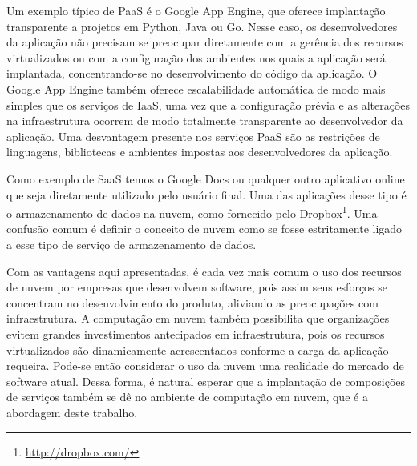 Um exemplo típico de PaaS é o Google App Engine, que oferece implantação transparente a projetos em Python, Java ou Go. Nesse caso, os desenvolvedores da aplicação não precisam se preocupar diretamente com a gerência dos recursos virtualizados ou com a configuração dos ambientes nos quais a aplicação será implantada, concentrando-se no desenvolvimento do código da aplicação. O Google App Engine também oferece escalabilidade automática de modo mais simples que os serviços de IaaS, uma vez que a configuração prévia e as alterações na infraestrutura ocorrem de modo totalmente transparente ao desenvolvedor da aplicação. Uma desvantagem presente nos serviços PaaS são as restrições de linguagens, bibliotecas e ambientes impostas aos desenvolvedores da aplicação.

Como exemplo de SaaS temos o Google Docs ou qualquer outro aplicativo online que seja diretamente utilizado pelo usuário final. Uma das aplicações desse tipo é o armazenamento de dados na nuvem, como fornecido pelo Dropbox\footnote{\url{http://dropbox.com/}}. Uma confusão comum é definir o conceito de nuvem como se fosse estritamente ligado a esse tipo de serviço de armazenamento de dados.

Com as vantagens aqui apresentadas, é cada vez mais comum o uso dos recursos de nuvem por empresas que desenvolvem software, pois assim seus esforços se concentram no desenvolvimento do produto, aliviando as preocupações com infraestrutura. A computação em nuvem também possibilita que organizações evitem grandes investimentos antecipados em infraestrutura, pois os recursos virtualizados são dinamicamente acrescentados conforme a carga da aplicação requeira. Pode-se então considerar o uso da nuvem uma realidade do mercado de software atual. Dessa forma, é natural esperar que a implantação de composições de serviços também se dê no ambiente de computação em nuvem, que é a abordagem deste trabalho. 
